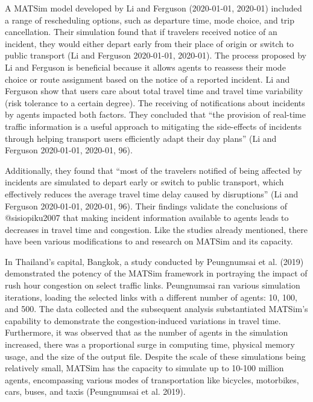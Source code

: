 \documentclass[
  letterpaper,
  DIV=11,
  numbers=noendperiod]{scrreprt}
\begin{document}
A MATSim model developed by Li and Ferguson (2020-01-01, 2020-01)
included a range of rescheduling options, such as departure time, mode
choice, and trip cancellation. Their simulation found that if travelers
received notice of an incident, they would either depart early from
their place of origin or switch to public transport (Li and Ferguson
2020-01-01, 2020-01). The process proposed by Li and Ferguson is
beneficial because it allows agents to reassess their mode choice or
route assignment based on the notice of a reported incident. Li and
Ferguson show that users care about total travel time and travel time
variability (risk tolerance to a certain degree). The receiving of
notifications about incidents by agents impacted both factors. They
concluded that ``the provision of real-time traffic information is a
useful approach to mitigating the side-effects of incidents through
helping transport users efficiently adapt their day plans'' (Li and
Ferguson 2020-01-01, 2020-01, 96).

Additionally, they found that ``most of the travelers notified of being
affected by incidents are simulated to depart early or switch to public
transport, which effectively reduces the average travel time delay
caused by disruptions'' (Li and Ferguson 2020-01-01, 2020-01, 96). Their
findings validate the conclusions of @sisiopiku2007 that making incident
information available to agents leads to decreases in travel time and
congestion. Like the studies already mentioned, there have been various
modifications to and research on MATSim and its capacity.

In Thailand's capital, Bangkok, a study conducted by Peungnumsai et al.
(2019) demonstrated the potency of the MATSim framework in portraying
the impact of rush hour congestion on select traffic links. Peungnumsai
ran various simulation iterations, loading the selected links with a
different number of agents: 10, 100, and 500. The data collected and the
subsequent analysis substantiated MATSim's capability to demonstrate the
congestion-induced variations in travel time. Furthermore, it was
observed that as the number of agents in the simulation increased, there
was a proportional surge in computing time, physical memory usage, and
the size of the output file. Despite the scale of these simulations
being relatively small, MATSim has the capacity to simulate up to 10-100
million agents, encompassing various modes of transportation like
bicycles, motorbikes, cars, buses, and taxis (Peungnumsai et al. 2019).
\end{document}
